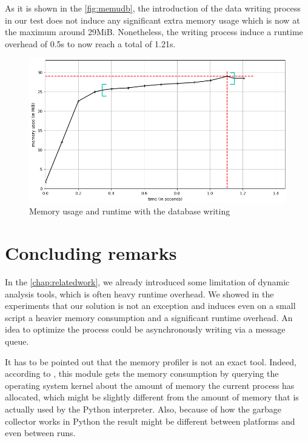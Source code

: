 As it is shown in the \autoref{fig:memudb}, the introduction of the data writing process in our test does not induce any significant extra memory usage which is now at the maximum around 29MiB. Nonetheless, the writing process induce a runtime overhead of 0.5s to now reach a total of 1.21s.
\begin{figure}[h!]
  \centering
    \includegraphics[width=\textwidth]{figures/experiments_figure_db.png}
    \caption{Memory usage and runtime with the database writing}
    \label{fig:memudb}
\end{figure}

\section{Concluding remarks}

In the \autoref{chap:relatedwork}, we already introduced some limitation of dynamic analysis tools, which is often heavy runtime overhead. We showed in the experiments that our solution is not an exception and induces even on a small script a heavier memory consumption and a significant runtime overhead. An idea to optimize the process could be asynchronously writing via a message queue.

It has to be pointed out that the memory profiler is not an exact tool. Indeed, according to \cite{Pedregos2016}, this module gets the memory consumption by querying the operating system kernel about the amount of memory the current process has allocated, which might be slightly different from the amount of memory that is actually used by the Python interpreter. Also, because of how the garbage collector works in Python the result might be different between platforms and even between runs.
